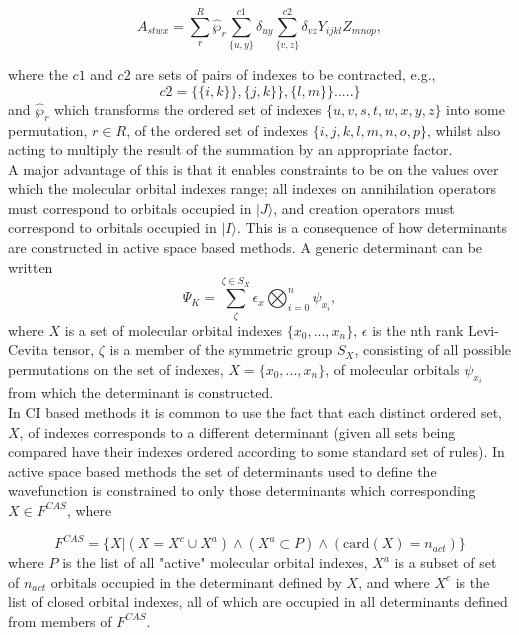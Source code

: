 \documentclass[12pt]{article}
\begin{document}
\begin{equation*}
A_{stwx} = \sum_{r}^{R}\hat{\wp}_{r}\sum^{c1}_{\{u,y\}}\delta_{uy}\sum^{c2}_{\{v,z\}} \delta_{vz}Y_{ijkl}Z_{mnop},
\end{equation*}

where the $c1$ and $c2$ are sets of pairs of indexes to be contracted, e.g.,
\begin{equation}
c2 = \{ \{i, k\} \} , \{j, k\} \} ,\{l, m\} \}.....\} 
\end{equation}
and $\hat{\wp}_{r}$ which transforms the ordered set of indexes
$\{u,v,s,t,w,x,y,z\}$ into some permutation, $r\in R$, of the ordered set of
indexes $\{i,j,k,l,m,n,o,p\}$, whilst also acting to multiply the result of the
summation by an appropriate factor.\\

\noindent A major advantage of this is that it enables constraints to be
on the values over which the molecular orbital indexes range; all indexes on 
annihilation operators must correspond to orbitals occupied in $|J\rangle$, and 
creation operators must correspond to orbitals occupied in $|I\rangle$. 
This is a consequence of how determinants are constructed in 
active space based methods. A generic determinant can be written
\begin{equation}
\Psi_{K} = \sum^{\zeta \in S_{X}}_{\zeta} \epsilon_{x} \bigotimes_{i=0}^{n}  \psi_{x_{i}},
\end{equation}
where $X$ is a set of molecular orbital indexes $\{x_{0},...,x_{n}\}$,
$\epsilon$ is the nth rank Levi-Cevita
tensor, $\zeta$ is a member of the symmetric group $S_{X}$,
consisting of all possible permutations on the set of indexes,
$X = \{x_{0},...,x_{n}\}$, of molecular orbitals $\psi_{x_{i}}$ from which the
determinant is constructed.\\

\noindent In CI based methods it is common to use the fact that 
each distinct ordered set, $X$, of indexes corresponds to a different 
determinant (given all sets being compared have their indexes ordered according
to some standard set of rules). In active space based methods the set of
determinants used to define the wavefunction is constrained to only
those determinants which corresponding $X \in {F^{CAS}}$, where

\begin{equation*}
F^{CAS} = \{ X | (X = X^{c} \cup X^{a}) \wedge (X^{a} \subset P) \wedge ( \text{card}(X) = n_{act} )  \}
\end{equation*}
where $P$ is the list of all "active" molecular orbital indexes, 
$X^{a}$ is a subset of set of $n_{act}$ orbitals occupied in the determinant defined by $X$, and
where $X^{c}$ is the list of closed orbital indexes, all of which are occupied in all determinants defined
from members of $F^{CAS}$.\\
\end{document}
